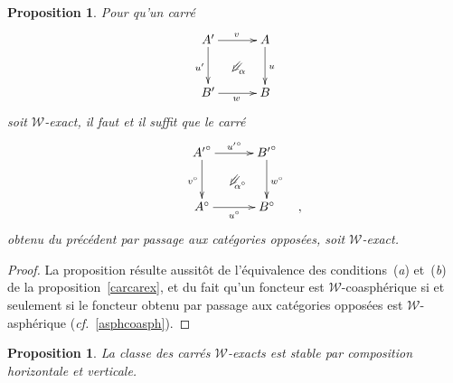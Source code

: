 \documentclass[francais]{smfart}
\theoremstyle{plain}
\newtheorem{prop}[thm]{Proposition}
\theoremstyle{remark}
\theoremstyle{definition}
\numberwithin{equation}{thm}
\begin{document}
\begin{prop} \label{carexop}
Pour qu'un carré
\[
\UseTwocells
\xymatrixcolsep{2.5pc}
\xymatrixrowsep{2.4pc}
\xymatrix{
A'\ar[d]_{u'}\ar[r]^{v}
\drtwocell<\omit>{\alpha}
&A\ar[d]^{u}
\\
B'\ar[r]_{w}
&B
}
\] 
soit ${\mathcal{W}}${\nobreakdash}-exact, il faut et il suffit que le carré
\[
\UseTwocells
\xymatrixcolsep{2.5pc}
\xymatrixrowsep{2.4pc}
\xymatrix{
&{{{A'}}^{\circ}}\ar[r]^{{{{u'}}^{\circ}}}\ar[d]_{{{{v}}^{\circ}}}
\drtwocell<\omit>{{{{\alpha}}^{\circ}}}
&{{{B'}}^{\circ}}\ar[d]^{{{{w}}^{\circ}}}
\\
&{{{A}}^{\circ}}\ar[r]_{{{{u}}^{\circ}}}
&{{{B}}^{\circ}}
&\hskip -35pt,
}
\] 
obtenu du précédent par passage aux catégories opposées, soit ${\mathcal{W}}${\nobreakdash}-exact.
\end{prop}

\begin{proof}
La proposition résulte aussitôt de l'équivalence des conditions~(\emph{a}) et~(\emph{b}) de la proposition~\ref{carcarex}, et du fait qu'un foncteur est ${\mathcal{W}}${\nobreakdash}-coasphérique si et seulement si le foncteur obtenu par passage aux catégories opposées est ${\mathcal{W}}${\nobreakdash}-asphérique ({\emph{cf.}}~\ref{asphcoasph}).
\end{proof}

\begin{prop} \label{compcarhex}
La classe des carrés ${\mathcal{W}}${\nobreakdash}-exacts est stable par composition horizontale et verticale.
\end{prop}
\end{document}
